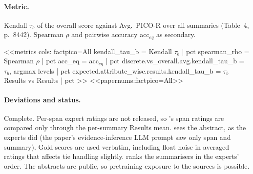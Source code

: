 \paragraph{Metric.} Kendall $\tau_b$ of the overall score against Avg.\ PICO-R over all summaries (Table~4, p.~8442).
Spearman $\rho$ and pairwise accuracy acc$_{eq}$ as secondary.

<<metrics
cols: factpico=All
kendall_tau_b = Kendall $\tau_b$ | pct
spearman_rho = Spearman $\rho$ | pct
acc_eq = acc$_{eq}$ | pct
discrete.vs_overall.avg.kendall_tau_b = $\tau_b$, argmax levels | pct
expected.attribute_wise.results.kendall_tau_b = $\tau_b$ Results vs Results | pct
>>
<<papernums:factpico=All>>

\paragraph{Deviations and status.} Complete. Per-span expert ratings are not released, so \jev{}'s span ratings are
compared only through the per-summary Results mean. \jev{} sees the abstract, as the experts did (the paper's
evidence-inference LLM prompt saw only span and summary). Gold scores are used verbatim, including float noise in
averaged ratings that affects tie handling slightly. \jev{} ranks the summarisers in the experts' order. The
abstracts are public, so pretraining exposure to the sources is possible.
